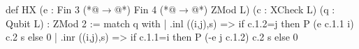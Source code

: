 def HX (e : Fin 3 (*@$\to$@*) Fin 4 (*@$\to$@*) ZMod L) (c : XCheck L) (q : Qubit L) : ZMod 2 := match q with
  | .inl ((i,j),s) => if c.1.2=j then P (e c.1.1 i) c.2 s else 0
  | .inr ((i,j),s) => if c.1.1=i then P (-e j c.1.2) c.2 s else 0
